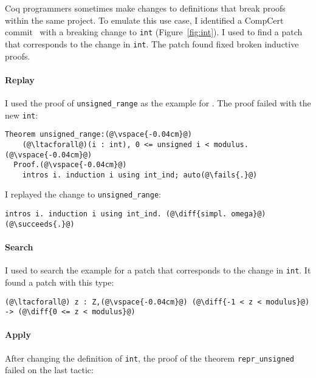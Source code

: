 Coq programmers sometimes make changes to definitions that break proofs
within the same project. To emulate this use case, 
I identified a CompCert commit~\cite{compcertcommit}
with a breaking change to \lstinline{int} (Figure~\ref{fig:int}). %
I used \sysname to find a patch that corresponds to the change in \lstinline{int}.
The patch \sysname found fixed broken inductive proofs.

\paragraph{Replay} I used the proof of \lstinline{unsigned_range} as the example for \sysname.
The proof failed with the new \lstinline{int}:

\lstset{language=coq, aboveskip=3pt,belowskip=3pt}
\begin{lstlisting}[language=coq]
  Theorem unsigned_range:(@\vspace{-0.04cm}@)
    (@\ltacforall@)(i : int), 0 <= unsigned i < modulus.(@\vspace{-0.04cm}@)
  Proof.(@\vspace{-0.04cm}@)
    intros i. induction i using int_ind; auto(@\fails{.}@)
\end{lstlisting}
I replayed the change to \lstinline{unsigned_range}:

\begin{lstlisting}[language=coq]
    intros i. induction i using int_ind. (@\diff{simpl. omega}@)(@\succeeds{.}@)
\end{lstlisting}

\paragraph{Search} I used \sysname to search the example for a patch that corresponds to the change in \lstinline{int}. It found
a patch with this type:

\begin{lstlisting}[language=coq]
   (@\ltacforall@) z : Z,(@\vspace{-0.04cm}@) (@\diff{-1 < z < modulus}@) -> (@\diff{0 <= z < modulus}@)
\end{lstlisting}

\paragraph{Apply} After changing the definition of \lstinline{int}, the proof of the
theorem \lstinline{repr_unsigned} failed on the last tactic:

